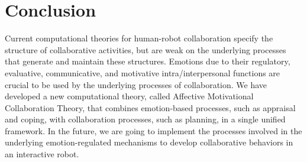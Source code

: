 \documentclass[letterpaper]{article}
\begin{document}
\section{Conclusion}

Current computational theories for human-robot collaboration specify the
structure of collaborative activities, but are weak on the underlying processes
that generate and maintain these structures. Emotions due to their regulatory,
evaluative, communicative, and motivative intra/interpersonal functions are
crucial to be used by the underlying processes of collaboration. We have
developed a new computational theory, called Affective Motivational
Collaboration Theory, that combines emotion-based processes, such as appraisal
and coping, with collaboration processes, such as planning, in a single unified
framework. In the future, we are going to implement the processes involved in
the underlying emotion-regulated mechanisms to develop collaborative behaviors
in an interactive robot.



\end{document}
